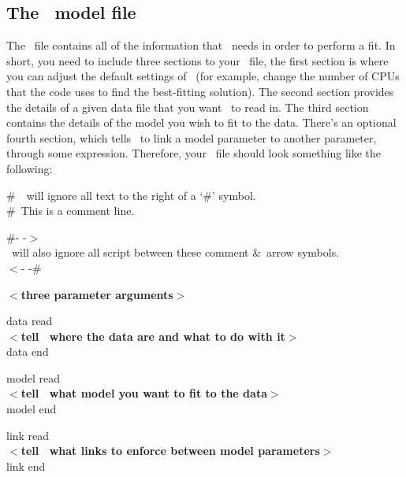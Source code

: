 \subsection{The \dmod\ model file}
\label{sec:dmod}

The \dmod\ file contains all of the information that \alis\ needs in order
to perform a fit. In short, you need to include three sections to your
\dmod\ file, the first section is where you can adjust the default settings
of \alis\ (for example, change the number of CPUs that the code uses
to find the best-fitting solution). The second section provides the details
of a given data file that you want \alis\ to read in. The third section contains
the details of the model you wish to fit to the data. There's an optional fourth
section, which tells \alis\ to link a model parameter to another parameter,
through some expression. Therefore, your \dmod\ file should look something
like the following:

\vspace{0.3cm}
\begin{mdframed}[style=MyFrame]
\#\ \alis\ will ignore all text to the right of a `\#' symbol.\\
\#\ This is a comment line.\\

\vspace{0.1cm}

\noindent
\#- -$>$\\
\alis\ will also ignore all script between these
comment \&\ arrow symbols.\\
$<$- -\#\\

\vspace{0.1cm}

\noindent
{\bfseries $<$three parameter arguments$>$}\\

\vspace{0.1cm}

\noindent
data read\\
{\bfseries $<$tell \alis\ where the data are and what to do with it$>$}\\
data end\\

\vspace{0.1cm}

\noindent
model read\\
{\bfseries $<$tell \alis\ what model you want to fit to the data$>$}\\
model end\\

\vspace{0.1cm}

\noindent
link read\\
{\bfseries $<$tell \alis\ what links to enforce between model parameters$>$}\\
link end
\end{mdframed}
\vspace{0.2cm}

